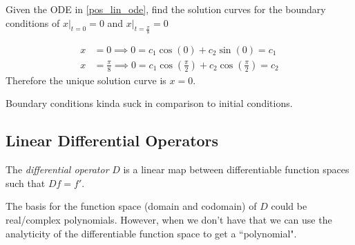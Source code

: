 \documentclass[notes]{subfiles}
\begin{document}
\begin{exercise}
    Given the ODE in \cref{pos_lin_ode}, find the solution curves for the boundary conditions of $x|_{t = 0} = 0$ and $x|_{t = \frac{\pi}{8}} = 0$
\end{exercise}
\begin{solution}
    \begin{align*}
        x &= 0 \implies 0 = c_1\cos(0) + c_2\sin(0) = c_1 \\
        x &= \frac{\pi}{8} \implies 0 = c_1\cos\left(\frac{\pi}{2}\right) + c_2\cos\left(\frac{\pi}{2}\right) = c_2
    \end{align*}
    Therefore the unique solution curve is $x = 0$.
\end{solution}
Boundary conditions kinda suck in comparison to initial conditions.

\subsection{Linear Differential Operators}
\begin{definition}
    The \textit{differential operator} $D$ is a linear map between differentiable function spaces such that $Df = f'$.
\end{definition}
The basis for the function space (domain and codomain) of $D$ could be real/complex polynomials. However, when we don't have that we can use the analyticity of the differentiable function space to get a ``polynomial".
\end{document}
